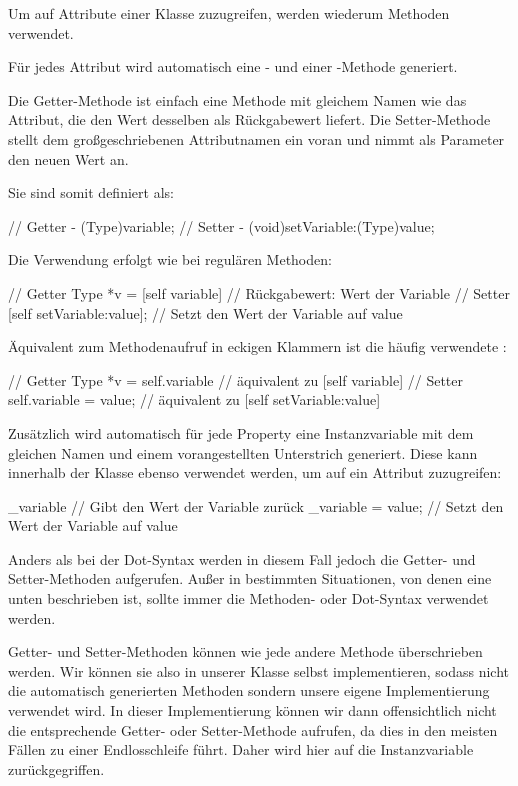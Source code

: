 \documentclass[parskip=half, final]{scrreprt}
\begin{document}
Um auf Attribute einer Klasse zuzugreifen, werden wiederum Methoden verwendet.

Für jedes Attribut wird automatisch eine - und einer -Methode generiert.

Die Getter-Methode ist einfach eine Methode mit gleichem Namen wie das Attribut, die den Wert desselben als Rückgabewert liefert. Die Setter-Methode stellt dem großgeschriebenen Attributnamen ein  voran und nimmt als Parameter den neuen Wert an.

Sie sind somit definiert als:
\begin{objclst}
// Getter
- (Type)variable;
// Setter
- (void)setVariable:(Type)value;
\end{objclst}

Die Verwendung erfolgt wie bei regulären Methoden:
\begin{objclst}
// Getter
Type *v = [self variable] // Rückgabewert: Wert der Variable
// Setter
[self setVariable:value]; // Setzt den Wert der Variable auf value
\end{objclst}

Äquivalent zum Methodenaufruf in eckigen Klammern ist die häufig verwendete :
\begin{objclst}
// Getter
Type *v = self.variable // äquivalent zu [self variable]
// Setter
self.variable = value; // äquivalent zu [self setVariable:value]
\end{objclst}

Zusätzlich wird automatisch für jede Property eine Instanzvariable mit dem gleichen Namen und einem vorangestellten Unterstrich \objc{_} generiert. Diese kann innerhalb der Klasse ebenso verwendet werden, um auf ein Attribut zuzugreifen:
\begin{objclst}
_variable // Gibt den Wert der Variable zurück
_variable = value; // Setzt den Wert der Variable auf value
\end{objclst}
Anders als bei der Dot-Syntax werden in diesem Fall jedoch  die Getter- und Setter-Methoden aufgerufen. Außer in bestimmten Situationen, von denen eine unten beschrieben ist, sollte immer die Methoden- oder Dot-Syntax verwendet werden.

Getter- und Setter-Methoden können wie jede andere Methode überschrieben werden. Wir können sie also in unserer Klasse selbst implementieren, sodass nicht die automatisch generierten Methoden sondern unsere eigene Implementierung verwendet wird. In dieser Implementierung können wir dann offensichtlich nicht die entsprechende Getter- oder Setter-Methode aufrufen, da dies in den meisten Fällen zu einer Endlosschleife führt. Daher wird hier auf die Instanzvariable zurückgegriffen.
\end{document}
